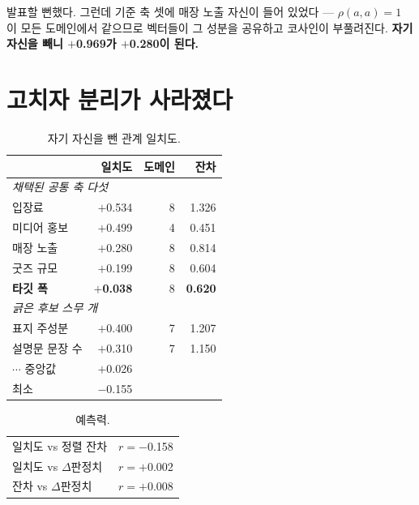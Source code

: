 \documentclass[10pt]{article}
\begin{document}
발표할 뻔했다. 그런데 기준 축 셋에 매장 노출 자신이 들어 있었다 ---
$\rho(a,a){=}1$ 이 모든 도메인에서 같으므로 벡터들이 그 성분을 공유하고
코사인이 부풀려진다. \textbf{자기 자신을 빼니 $+$0.969가 $+$0.280이 된다.}


\section{고치자 분리가 사라졌다}

\begin{table}[t]
\centering\tsize
\caption{자기 자신을 뺀 관계 일치도.}
\begin{tabular}{lrrr}
\toprule
& 일치도 & 도메인 & 잔차 \\
\midrule
\multicolumn{4}{l}{\emph{채택된 공통 축 다섯}} \\
입장료 & $+$0.534 & 8 & 1.326 \\
미디어 홍보 & $+$0.499 & 4 & 0.451 \\
매장 노출 & $+$0.280 & 8 & 0.814 \\
굿즈 규모 & $+$0.199 & 8 & 0.604 \\
\textbf{타깃 폭} & \textbf{$+$0.038} & 8 & \textbf{0.620} \\
\midrule
\multicolumn{4}{l}{\emph{긁은 후보 스무 개}} \\
표지 주성분 & $+$0.400 & 7 & 1.207 \\
설명문 문장 수 & $+$0.310 & 7 & 1.150 \\
$\cdots$ 중앙값 & $+$0.026 & & \\
최소 & $-$0.155 & & \\
\bottomrule
\end{tabular}
\end{table}


\begin{table}[t]
\centering\tsize
\caption{예측력.}
\begin{tabular}{lr}
\toprule
일치도 vs 정렬 잔차 & $r{=}-$0.158 \\
일치도 vs $\Delta$판정치 & $r{=}+$0.002 \\
잔차 vs $\Delta$판정치 & $r{=}+$0.008 \\
\bottomrule
\end{tabular}
\end{table}
\end{document}
